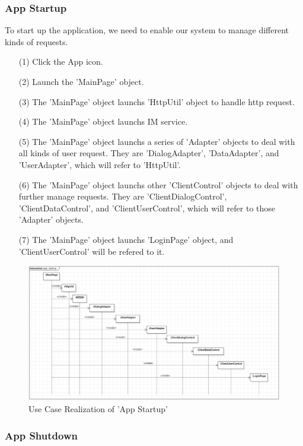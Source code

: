 \documentclass[10pt]{article}
\begin{document}
\subsubsection{App Startup}
To start up the application, we need to enable our system to manage different kinds of requests.

\begin{itemize}
	\item[(1)] Click the App icon.
	\item[(2)] Launch the 'MainPage' object.
	\item[(3)] The 'MainPage' object launchs 'HttpUtil' object to handle http request.
	\item[(4)] The 'MainPage' object launchs IM service.
	\item[(5)] The 'MainPage' object launchs a series of 'Adapter' objects to deal with all kinds of user request. They are 'DialogAdapter', 'DataAdapter', and 'UserAdapter', which will refer to 'HttpUtil'.
	\item[(6)] The 'MainPage' object launchs other 'ClientControl' objects to deal with further manage requests.  They are 'ClientDialogControl', 'ClientDataControl', and 'ClientUserControl', which will refer to those 'Adapter' objects. 
	\item[(7)]  The 'MainPage' object launchs 'LoginPage' object, and 'ClientUserControl' will be refered to it.
\end{itemize}

\begin{figure}[H]
	\centering
	\includegraphics[width=14cm]{3.jpg} 
	\caption{Use Case Realization of 'App Startup'}
	\label{Use Case Realization of 'App Startup'}
\end{figure}

\subsubsection{App Shutdown}
\end{document}
